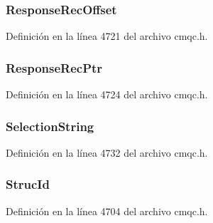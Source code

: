 \subsubsection[{Response\+Rec\+Offset}]{ Response\+Rec\+Offset}\label{structtag_m_q_o_d_a944cab1325e5696fccf9202988c81066}


Definición en la línea 4721 del archivo cmqc.\+h.

\hypertarget{structtag_m_q_o_d_a3f96e15a2299a7c139b78c4e1b8cb7cb}{}
\subsubsection[{Response\+Rec\+Ptr}]{ Response\+Rec\+Ptr}\label{structtag_m_q_o_d_a3f96e15a2299a7c139b78c4e1b8cb7cb}


Definición en la línea 4724 del archivo cmqc.\+h.

\hypertarget{structtag_m_q_o_d_ab3a91014a229bd897c17cbd04563bca2}{}
\subsubsection[{Selection\+String}]{ Selection\+String}\label{structtag_m_q_o_d_ab3a91014a229bd897c17cbd04563bca2}


Definición en la línea 4732 del archivo cmqc.\+h.

\hypertarget{structtag_m_q_o_d_a0530922ca944569b52601d74941f96e4}{}
\subsubsection[{Struc\+Id}]{ Struc\+Id}\label{structtag_m_q_o_d_a0530922ca944569b52601d74941f96e4}


Definición en la línea 4704 del archivo cmqc.\+h.

\hypertarget{structtag_m_q_o_d_a6443c93f9930aa26f661e00e631a32ea}{}
